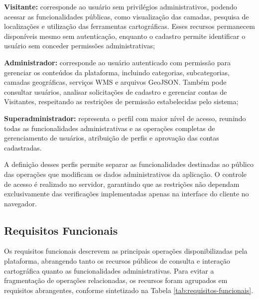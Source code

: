 \begin{alineascomponto}

    \item \textbf{Visitante:} corresponde ao usuário sem privilégios administrativos, podendo acessar as funcionalidades públicas, como visualização das camadas, pesquisa de localizações e utilização das ferramentas cartográficas. Esses recursos permanecem disponíveis mesmo sem autenticação, enquanto o cadastro permite identificar o usuário sem conceder permissões administrativas;

    \item \textbf{Administrador:} corresponde ao usuário autenticado com permissão para gerenciar os conteúdos da plataforma, incluindo categorias, subcategorias, camadas geográficas, serviços WMS e arquivos GeoJSON. Também pode consultar usuários, analisar solicitações de cadastro e gerenciar contas de Visitantes, respeitando as restrições de permissão estabelecidas pelo sistema;

    \item \textbf{Superadministrador:} representa o perfil com maior nível de acesso, reunindo todas as funcionalidades administrativas e as operações completas de gerenciamento de usuários, atribuição de perfis e aprovação das contas cadastradas.
\end{alineascomponto}

A definição desses perfis permite separar as funcionalidades destinadas ao público das operações que modificam os dados administrativos da aplicação. O controle de acesso é realizado no servidor, garantindo que as restrições não dependam exclusivamente das verificações implementadas apenas na interface do cliente no navegador.

\subsection{Requisitos Funcionais}
\label{sec:requisitos-funcionais}

Os requisitos funcionais descrevem as principais operações disponibilizadas pela plataforma, abrangendo tanto os recursos públicos de consulta e interação cartográfica quanto as funcionalidades administrativas. Para evitar a fragmentação de operações relacionadas, os recursos foram agrupados em requisitos abrangentes, conforme sintetizado na Tabela \ref{tab:requisitos-funcionais}.

